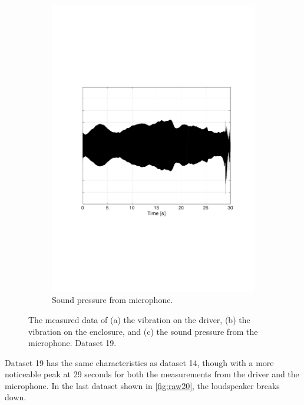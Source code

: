 \begin{figure}[H]
\begin{subfigure}[t]{0.3\textwidth}
	\includegraphics[width=1\textwidth]{figures/raw_microphone19.pdf}
	\caption{Sound pressure from microphone.}
	\label{fig:raw_microphone19}
\end{subfigure}
\caption{The measured data of (a) the vibration on the driver, (b) the vibration on the enclosure, and (c) the sound pressure from the microphone. Dataset 19.}
\label{fig:raw19}
\end{figure} 

Dataset 19 has the same characteristics as dataset 14, though with a more noticeable peak at 29 seconds for both the measurements from the driver and the microphone. In the last dataset shown in \autoref{fig:raw20}, the loudspeaker breaks down.


